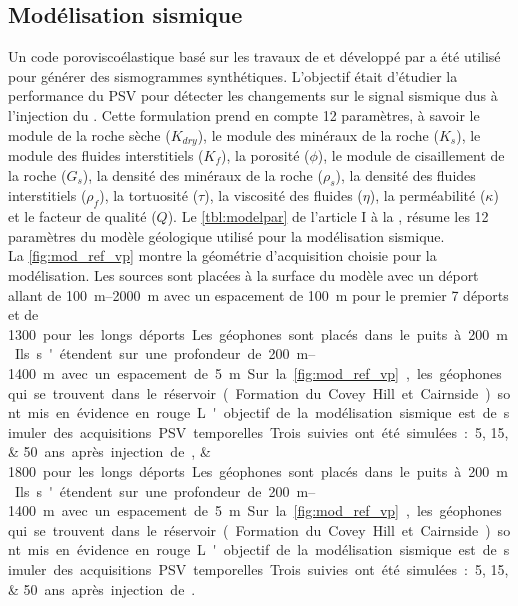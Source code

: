 \subsection{Modélisation sismique}
Un code poroviscoélastique basé sur les travaux de \citet{Carcione1995,Carcione1996,Carcione1999} et développé par \citet{Giroux2012} a été utilisé pour générer des sismogrammes synthétiques. L'objectif était d'étudier la performance du PSV pour détecter les changements sur le signal sismique dus à l'injection du . Cette formulation prend en compte 12 paramètres, à savoir le module de la roche sèche ($K_{dry}$), le module des minéraux de la roche ($K_s$), le module des fluides interstitiels ($K_{f}$), la porosité ($\phi$), le module de cisaillement de la roche ($G_s$), la densité des minéraux de la roche ($\rho_s$), la densité des fluides interstitiels ($\rho_f$), la tortuosité ($\tau$), la viscosité des fluides ($\eta$), la perméabilité ($\kappa$) et le facteur de qualité ($Q$). Le \cref{tbl:modelpar} de l'article I à la , résume les 12 paramètres du modèle géologique utilisé pour la modélisation sismique. \\
La \cref{fig:mod_ref_vp} montre la géométrie d'acquisition choisie pour la modélisation. Les sources sont placées à la surface du modèle avec un déport allant de \SIrange{100}{2000}{\metre} avec un espacement de \SI{100}{\metre} pour le premier \num{7} déports et de \SIlist{1300;1800} pour les longs déports. Les géophones sont placés dans le puits à \SI{200}{\metre}. Ils s'étendent sur une profondeur de \SIrange{200}{1400}{\metre} avec un espacement de \SI{5}{\metre}. Sur la \cref{fig:mod_ref_vp}, les géophones qui se trouvent dans le réservoir (Formation du Covey Hill et Cairnside) sont mis en évidence en rouge.
L'objectif de la modélisation sismique est de simuler des acquisitions PSV temporelles. Trois suivies ont été simulées: \numlist{5;15;50} ans après injection de .
